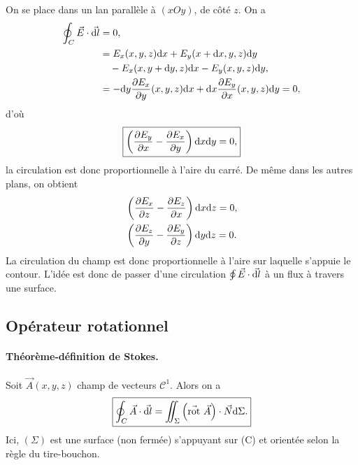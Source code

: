         On se place dans un lan parallèle à $(xOy)$, de côté $z$. On a 
        \begin{align}
            \oint_{C}\vec{E}\cdot\vec{\mathrm{d} l}
            &=0,\\
            &=
            E_x(x,y,z)\mathrm{d} x+E_y(x+\mathrm{d} x,y,z)\mathrm{d} y\\
            &\quad-E_x(x,y+\mathrm{d} y,z)\mathrm{d} x-E_y(x,y,z)\mathrm{d} y,\\
            &=
            -\mathrm{d} y\frac{\partial E_x}{\partial y}(x,y,z)\mathrm{d} x+\mathrm{d} x\frac{\partial E_y}{\partial x}(x,y,z)\mathrm{d} y=0,
        \end{align}
        d'où
        \begin{equation}
            \boxed{
            \left(\frac{\partial E_y}{\partial x}-\frac{\partial E_x}{\partial y}\right)\mathrm{d} x\mathrm{d} y=0,}
        \end{equation}
        la circulation est donc proportionnelle à l'aire du carré. De même dans les autres plans, on obtient
        \begin{equation}
            \begin{aligned}
                &\left(\frac{\partial E_x}{\partial z}-\frac{\partial E_z}{\partial x}\right)\mathrm{d} x\mathrm{d} z=0,\\
                &\left(\frac{\partial E_z}{\partial y}-\frac{\partial E_y}{\partial z}\right)\mathrm{d} y\mathrm{d} z=0.
            \end{aligned}
        \end{equation}
        La circulation du champ est donc proportionnelle à l'aire sur laquelle s'appuie le contour. L'idée est donc de passer d'une circulation $\oint\vec{E}\cdot\vec{\mathrm{d} l}$ à un flux à travers une surface.

    \subsection{Opérateur rotationnel}

        \paragraph{Théorème-définition de Stokes.}

            Soit $\vec{A}(x,y,z)$ champ de vecteurs $\mathcal{C}^{1}$. Alors on a 
            \begin{equation}
                \boxed{
                    \oint_{C}\vec{A}\cdot\vec{\mathrm{d} l}=\iint_{\Sigma}\left(\vec{\mathrm{rot}}~\vec{A}\right)\cdot\vec{N}\mathrm{d}\Sigma.
                }
            \end{equation}
            Ici, $(\Sigma)$ est une surface (non fermée) s'appuyant sur (C) et orientée selon la règle du tire-bouchon.

